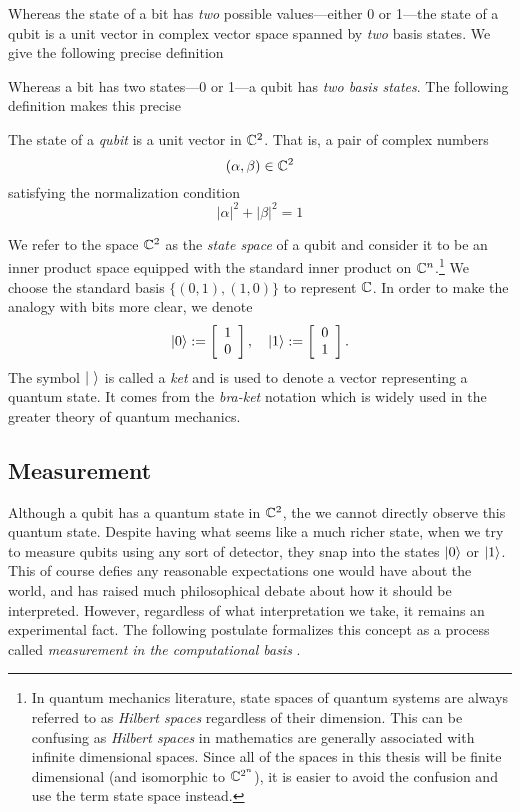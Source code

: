         Whereas the state of a bit has \emph{two} possible values---either 0 or 1---the state of a qubit is a unit
        vector in complex vector space spanned by \emph{two} basis states. We give the following precise definition

        Whereas a bit has two states---0 or 1---a qubit has \emph{two basis states}. The following definition makes 
        this precise
        \begin{definition}
            The state of a \emph{qubit} is a unit vector in $\mathbb{C}^2$. That is, a pair of complex numbers
            \[
                (\alpha, \beta) \in \mathbb{C}^2
            \]
            satisfying the normalization condition %
            \[
                |\alpha|^2 + |\beta|^2 = 1
            \]
        \end{definition}
        
        We refer to the space $\mathbb{C}^2$ as the \emph{state space} of a qubit and consider it to be an inner product 
        space equipped with the standard inner product on $\mathbb{C}^n$.\footnote{In quantum mechanics literature, state 
            spaces of quantum systems are always referred to as \emph{Hilbert spaces} regardless of their 
            dimension. This can be confusing as \emph{Hilbert spaces} in mathematics are generally associated with 
        infinite dimensional spaces. Since all of the spaces in this thesis will be finite dimensional (and 
    isomorphic to $\mathbb{C}^{2^n}$), it is easier to avoid the confusion and use the term state space instead.}
    We choose the standard basis $\{(0,1), (1,0)\}$ to represent $\mathbb{C}$. In order to make the analogy with bits more 
    clear, we denote \[
            \ket{0} := \left[\begin{array}{r}1\\0\end{array}\right], \quad
            \ket{1} := \left[\begin{array}{r}0\\1\end{array}\right].
         \] The symbol $\ket{\ }$ is called a \emph{ket} and is used to denote a vector representing a quantum 
         state. It comes from the \emph{bra-ket} notation which is widely used in the greater theory of quantum 
         mechanics.
        
        
         \subsection{Measurement} 
         
         Although a qubit has a quantum state in $\mathbb{C}^2$, the we cannot directly observe this quantum state. Despite 
         having what seems like a much richer state, when we try to measure qubits using any sort of detector, they 
         snap into the states $\ket{0}$ or $\ket{1}$. This of course defies any reasonable expectations one would 
         have about the world, and has raised much philosophical debate about how it should be interpreted. 
         However, regardless of what interpretation we take, it remains an experimental fact. The following 
         postulate formalizes this concept as a process called \emph{measurement in the computational basis} .

